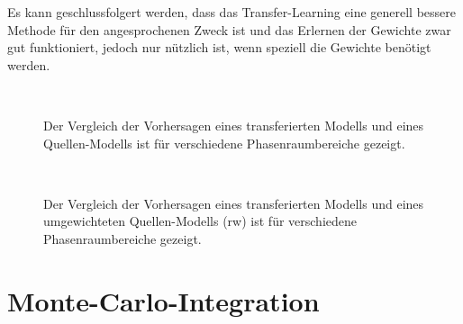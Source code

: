 Es kann geschlussfolgert werden, dass das Transfer-Learning eine generell bessere Methode für den angesprochenen Zweck ist und das Erlernen der Gewichte zwar gut funktioniert, jedoch nur nützlich ist, wenn speziell die Gewichte benötigt werden.
\begin{figure}[hb!]
	\centering
	 \\
	\caption{Der Vergleich der Vorhersagen eines transferierten Modells und eines Quellen-Modells ist für verschiedene Phasenraumbereiche gezeigt.}
	\label{Vgl-transfer-not-rw}
\end{figure}
\begin{figure}[h]
	\centering
	 \\
	\caption{Der Vergleich der Vorhersagen eines transferierten Modells und eines umgewichteten Quellen-Modells (rw) ist für verschiedene Phasenraumbereiche gezeigt.}
	\label{Vgl-transfer-rw}
\end{figure}
\section{Monte-Carlo-Integration}
